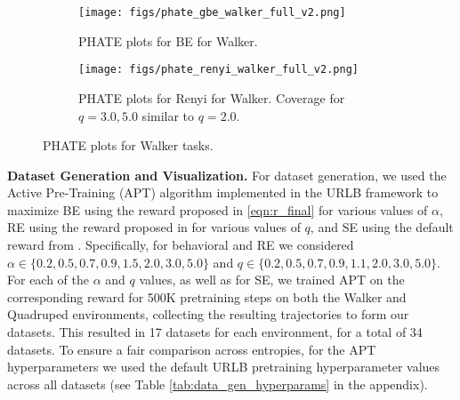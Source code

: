 \begin{wrapfigure}{r}{0.45\textwidth}
    \vspace{-3mm}
    \begin{subfigure}[b]{0.98\linewidth}
        \texttt{[image: figs/phate\_gbe\_walker\_full\_v2.png]}
        \caption{PHATE plots for BE for Walker.}
        \label{fig:phate_gbe_walker_full}
    \end{subfigure}
    \centering

    \begin{subfigure}[b]{0.98\linewidth}
        \texttt{[image: figs/phate\_renyi\_walker\_full\_v2.png]}
        \caption{PHATE plots for Renyi for Walker. Coverage for $q = 3.0, 5.0$ similar to $q = 2.0$.}
        \label{fig:phate_renyi_walker_full}
    \end{subfigure}
    \caption{\small PHATE plots for Walker tasks.}
    \label{fig:phate_walker_full}
    \vspace{-5mm}
\end{wrapfigure}
%
\noindent\textbf{Dataset Generation and Visualization.} For dataset generation, we used the Active Pre-Training (APT) algorithm \citep{liu2021behavior} implemented in the URLB framework to maximize BE using the reward proposed in \eqref{eqn:r_final} for various values of $\alpha$, RE using the reward proposed in \cite{zhang2021exploration} for various values of $q$, and SE using the default reward from \cite{liu2021behavior}. Specifically, for behavioral and RE we considered $\alpha \in \{ 0.2, 0.5, 0.7, 0.9, 1.5, 2.0, 3.0, 5.0 \}$ and $q \in \{ 0.2, 0.5, 0.7, 0.9, 1.1, 2.0, 3.0, 5.0 \}$.
%
%
%
For each of the $\alpha$ and $q$ values, as well as for SE, we trained APT on the corresponding reward for 500K pretraining steps on both the Walker and Quadruped environments, collecting the resulting trajectories to form our datasets. This resulted in 17 datasets for each environment, for a total of 34 datasets. To ensure a fair comparison across entropies, for the APT hyperparameters we used the default URLB pretraining hyperparameter values across all datasets (see Table \ref{tab:data_gen_hyperparams} in the appendix). 

